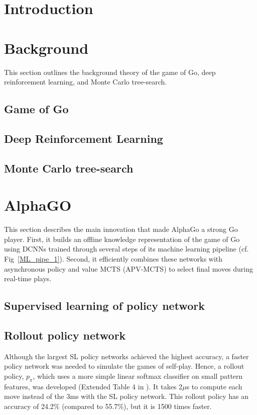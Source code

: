 \documentclass[conference]{IEEEtran}
\begin{document}
\section{Introduction}



\section{Background}
This section outlines the background theory of the game of Go, deep reinforcement learning, and Monte Carlo tree-search.

\subsection{Game of Go}


\subsection{Deep Reinforcement Learning} \label{GT}




\subsection{Monte Carlo tree-search} \label{MCTS_basic}



\section{AlphaGO} \label{AlphaGo}
This section describes the main innovation that made AlphaGo a strong Go player. First, it builds an offline knowledge representation of the game of Go using DCNNs trained through several steps of its machine learning pipeline (cf. Fig~\ref{ML_pipe_1}). Second, it efficiently combines these networks with asynchronous policy and value MCTS (APV-MCTS) to select final moves during real-time plays. 


\subsection{Supervised learning of policy network}



\subsection{Rollout policy network}
Although the largest SL policy networks achieved the highest accuracy, a faster policy network was needed to simulate the games of self-play. Hence, a rollout policy, $p_\pi$, which uses a more simple linear softmax classifier on small pattern features, was developed (Extended Table 4 in \cite{b12}). It takes 2$\mu$s to compute each move instead of the 3ms with the SL policy network. This rollout policy has an accuracy of 24.2\% (compared to 55.7\%), but it is 1500 times faster. 
\end{document}
